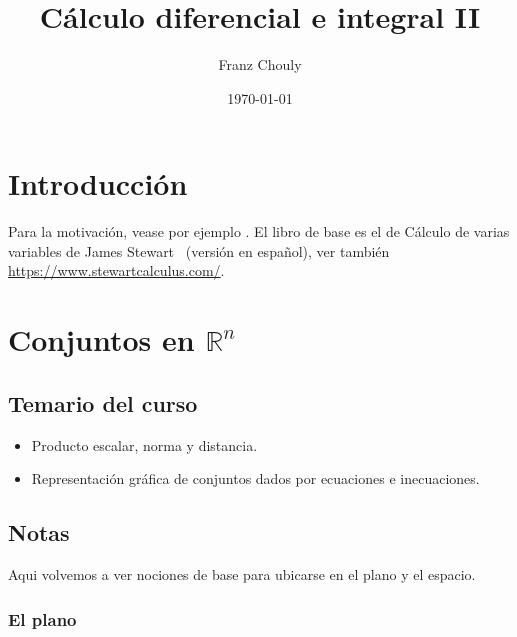 \documentclass[11pt]{book}
\title{C\'alculo diferencial e integral II}
\author{Franz Chouly}
\date{\today}
\theoremstyle{definicion}
\theoremstyle{teorema}
\theoremstyle{ejemplo}
\begin{document}
\maketitle

\tableofcontents

\chapter{Introducci\'on}

\noindent Para la motivaci\'on, vease por ejemplo \cite{chorin1993}.
El libro de base es el de Cálculo de varias variables de James Stewart~\cite{stewartmanyvariables} (versi\'on en espa\~nol), ver tambi\'en
\url{https://www.stewartcalculus.com/}.
%

\chapter{Conjuntos en $\mathbb{R}^n$}

\section{Temario del curso}

\begin{itemize}
    \item Producto escalar, norma y distancia.
    \item Representación gráfica de conjuntos dados por ecuaciones e inecuaciones. 
\end{itemize}

\section{Notas}

\noindent
Aqui volvemos a ver nociones de base para ubicarse en el plano y el espacio.

\subsection{El plano}
\end{document}
